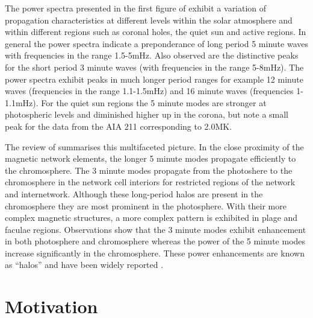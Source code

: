 \documentclass[linenumbers]{aastex63}
\begin{document}
The power spectra presented in the first figure of \citet{Griffiths2018b} exhibit a variation of propagation characteristics at different levels within the solar atmosphere and within different regions such as coronal holes, the quiet sun and active regions. In general the power spectra indicate a preponderance of long period 5 minute waves with frequencies in the range 1.5-5mHz. Also observed are the distinctive peaks for the short period 3 minute waves (with frequencies in the range 5-8mHz). The power spectra exhibit peaks in much longer period ranges for example 12 minute waves  (frequencies in the range 1.1-1.5mHz)  and 16 minute waves (frequencies 1-1.1mHz). For the quiet sun regions the 5 minute modes are stronger at photospheric levels and diminished higher up in the corona, but note a small peak for the data from the AIA 211 corresponding to 2.0MK. 


The review of \citet{Khomenko2013} summarises this multifaceted picture. In the close proximity of the magnetic network elements, the longer 5 minute modes propagate efficiently to the chromosphere. The 3 minute modes propagate from the photoshere to the chromosphere in the network cell interiors for restricted regions of the network and internetwork. Although these long-period halos are present in the chromosphere they are most prominent in the photosphere. With their more complex magnetic structures, a more complex pattern is exhibited in plage and faculae regions. Observations show that the 3 minute modes exhibit enhancement in both photosphere and chromosphere whereas the power of the 5 minute modes increase significantly in the chromosphere. These power enhancements are known as “halos” and have been widely reported \citet{Kontogiannis2010}. 





\section{Motivation} \label{sec:motivation}
\end{document}
